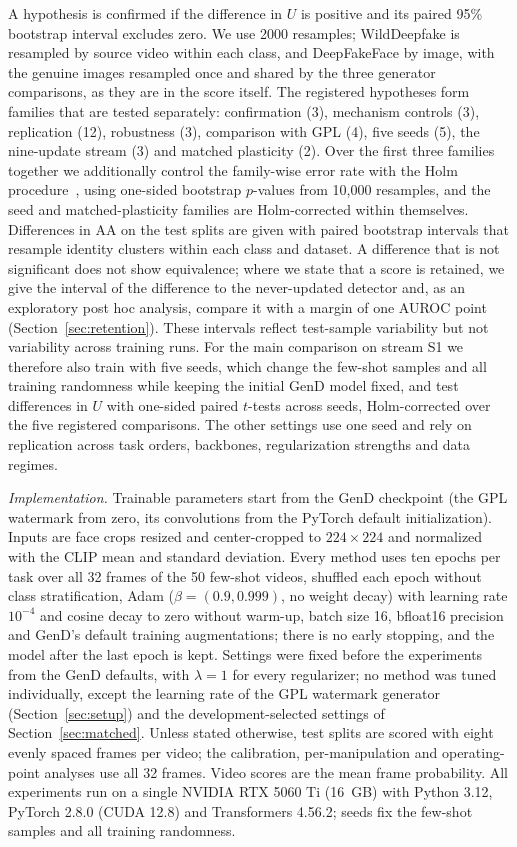 \documentclass[journal]{IEEEtran}
\begin{document}
A hypothesis is confirmed if the difference in $U$ is positive and its paired 95\% bootstrap interval excludes zero. We use 2000 resamples; WildDeepfake is resampled by source video within each class, and DeepFakeFace by image, with the genuine images resampled once and shared by the three generator comparisons, as they are in the score itself. The registered hypotheses form families that are tested separately: confirmation (3), mechanism controls (3), replication (12), robustness (3), comparison with GPL (4), five seeds (5), the nine-update stream (3) and matched plasticity (2). Over the first three families together we additionally control the family-wise error rate with the Holm procedure~\cite{holm1979}, using one-sided bootstrap $p$-values from 10{,}000 resamples, and the seed and matched-plasticity families are Holm-corrected within themselves. Differences in AA on the test splits are given with paired bootstrap intervals that resample identity clusters within each class and dataset. A difference that is not significant does not show equivalence; where we state that a score is retained, we give the interval of the difference to the never-updated detector and, as an exploratory post hoc analysis, compare it with a margin of one AUROC point (Section~\ref{sec:retention}). These intervals reflect test-sample variability but not variability across training runs. For the main comparison on stream S1 we therefore also train with five seeds, which change the few-shot samples and all training randomness while keeping the initial GenD model fixed, and test differences in $U$ with one-sided paired $t$-tests across seeds, Holm-corrected over the five registered comparisons. The other settings use one seed and rely on replication across task orders, backbones, regularization strengths and data regimes.

\textit{Implementation.} Trainable parameters start from the GenD checkpoint (the GPL watermark from zero, its convolutions from the PyTorch default initialization). Inputs are face crops resized and center-cropped to $224\times224$ and normalized with the CLIP mean and standard deviation. Every method uses ten epochs per task over all 32 frames of the 50 few-shot videos, shuffled each epoch without class stratification, Adam ($\beta=(0.9,0.999)$, no weight decay) with learning rate $10^{-4}$ and cosine decay to zero without warm-up, batch size 16, bfloat16 precision and GenD's default training augmentations; there is no early stopping, and the model after the last epoch is kept. Settings were fixed before the experiments from the GenD defaults, with $\lambda=1$ for every regularizer; no method was tuned individually, except the learning rate of the GPL watermark generator (Section~\ref{sec:setup}) and the development-selected settings of Section~\ref{sec:matched}. Unless stated otherwise, test splits are scored with eight evenly spaced frames per video; the calibration, per-manipulation and operating-point analyses use all 32 frames. Video scores are the mean frame probability. All experiments run on a single NVIDIA RTX 5060 Ti (16~GB) with Python 3.12, PyTorch 2.8.0 (CUDA 12.8) and Transformers 4.56.2; seeds fix the few-shot samples and all training randomness.
\end{document}
